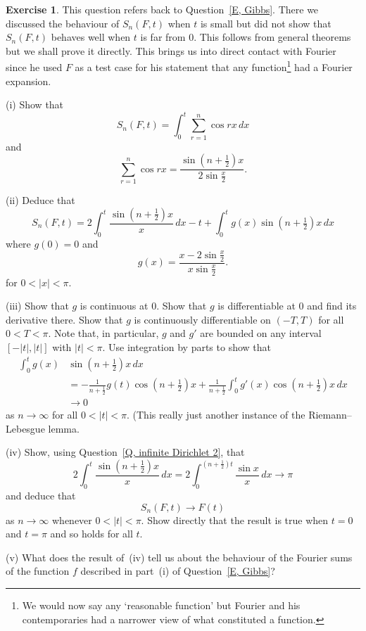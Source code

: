 \documentclass[12pt]{article}
\theoremstyle{definition}
\newtheorem{question}{Exercise}[section]
\begin{document}
\begin{question}\label{E, Fourier} 
This question refers back to Question~\ref{E, Gibbs}.
There we discussed the behaviour of $S_{n}(F,t)$ when $t$ is small
but did not show that $S_{n}(F,t)$ behaves well when $t$ is far from $0$.
This follows from general theorems but we shall prove it directly.
This brings us into direct contact with Fourier since he used
$F$ as a test case for his statement that any
function\footnote{We would now say any `reasonable function'
but Fourier and his contemporaries had a narrower view
of what constituted a function.} had a Fourier expansion.

(i) Show that
\[S_{n}(F,t)=\int_{0}^{t}\sum_{r=1}^{n}\cos rx\,dx\]
and
\[\sum_{r=1}^{n}\cos rx=\frac{\sin(n+\tfrac{1}{2})x}{2\sin\tfrac{x}{2}}.\]

(ii) Deduce that
\[S_{n}(F,t)=2\int_{0}^{t}\frac{\sin(n+\tfrac{1}{2})x}{x}\,dx
-t+\int_{0}^{t}g(x)\sin(n+\tfrac{1}{2})x\,dx\]
where $g(0)=0$
and
\[g(x)=\frac{x-2\sin\tfrac{x}{2}}{x\sin\tfrac{x}{2}}.\]
for $0<|x|<\pi$.

(iii) Show that $g$ is continuous at $0$. Show that $g$ is
differentiable at $0$ and find its derivative there. Show
that $g$ is continuously differentiable on $(-T,T)$ for
all $0<T<\pi$. Note that, in particular, $g$ and $g'$
are bounded on any interval $[-|t|,|t|]$ with
$|t|<\pi$. Use integration by parts to show that
\begin{align*}
\int_{0}^{t}g(x)&\sin(n+\tfrac{1}{2})x\,dx\\
&=-\frac{1}{n+\tfrac{1}{2}}g(t)\cos(n+\tfrac{1}{2})x
+\frac{1}{n+\tfrac{1}{2}}
\int_{0}^{t}g'(x)\cos(n+\tfrac{1}{2})x\,dx\\
&\rightarrow 0
\end{align*}
as $n\rightarrow \infty$ for all $0<|t|<\pi$.
(This really just another instance of the Riemann--Lebesgue
lemma.


(iv) Show, using Question~\ref{Q, infinite Dirichlet 2},
that
\[2\int_{0}^{t}\frac{\sin(n+\tfrac{1}{2})x}{x}\,dx
=2\int_{0}^{(n+\tfrac{1}{2})t}\frac{\sin x}{x}\,dx
\rightarrow \pi\]
and deduce that
\[S_{n}(F,t)\rightarrow F(t)\]
as $n\rightarrow\infty$ whenever $0<|t|<\pi$. Show directly
that the result is true when $t=0$ and $t=\pi$
and so holds for all $t$.

(v) What does the result of~(iv) tell us about the behaviour
of the Fourier sums of the function $f$ described in
part~(i) of Question~\ref{E, Gibbs}?
\end{question}
\end{document}
